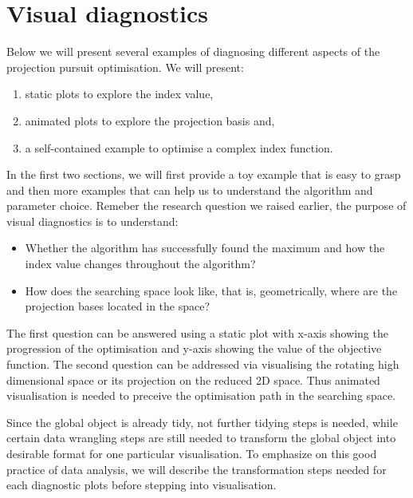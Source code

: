 \documentclass[12pt]{article}
\begin{document}
\hypertarget{visual-diagnostics}{%
\section{Visual diagnostics}\label{visual-diagnostics}}

Below we will present several examples of diagnosing different aspects
of the projection pursuit optimisation. We will present:

\begin{enumerate}
\def\labelenumi{\arabic{enumi})}
\item
  static plots to explore the index value,
\item
  animated plots to explore the projection basis and,
\item
  a self-contained example to optimise a complex index function.
\end{enumerate}

In the first two sections, we will first provide a toy example that is
easy to grasp and then more examples that can help us to understand the
algorithm and parameter choice. Remeber the research question we raised
earlier, the purpose of visual diagnostics is to understand:

\begin{itemize}
\item
  Whether the algorithm has successfully found the maximum and how the
  index value changes throughout the algorithm?
\item
  How does the searching space look like, that is, geometrically, where
  are the projection bases located in the space?
\end{itemize}

The first question can be answered using a static plot with x-axis
showing the progression of the optimisation and y-axis showing the value
of the objective function. The second question can be addressed via
visualising the rotating high dimensional space or its projection on the
reduced 2D space. Thus animated visualisation is needed to preceive the
optimisation path in the searching space.

Since the global object is already tidy, not further tidying steps is
needed, while certain data wrangling steps
\citep{wickham2016rfordatascience} are still needed to transform the
global object into desirable format for one particular visualisation. To
emphasize on this good practice of data analysis, we will describe the
transformation steps needed for each diagnostic plots before stepping
into visualisation.
\end{document}
